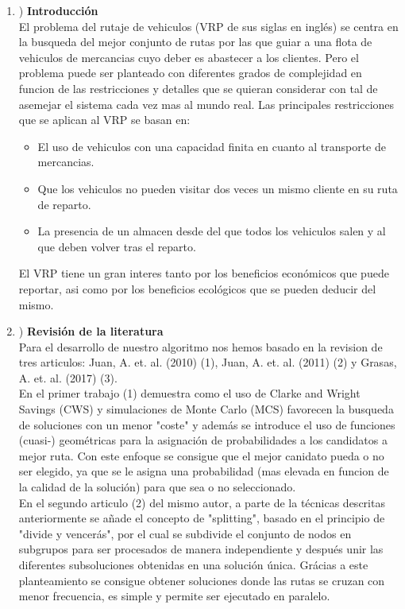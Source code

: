 \documentclass[11pt]{article} %
\begin{document}
\renewcommand{\labelenumi}{\arabic{enumi}}
 \begin{enumerate}
   \item) \textbf{Introducción}\\[0.2cm]
El problema del rutaje de vehiculos (VRP de sus siglas en inglés) se centra en la busqueda del mejor conjunto de rutas por las que guiar a una flota de vehiculos de mercancias cuyo deber es abastecer a los clientes. Pero el problema puede ser planteado con diferentes grados de complejidad en funcion de las restricciones y detalles que se quieran considerar con tal de asemejar el sistema cada vez mas al mundo real. Las principales restricciones que se aplican al VRP se basan en:
   \begin{itemize}
       \item El uso de vehiculos con una capacidad finita en cuanto al transporte de mercancias.
       \item Que los vehiculos no pueden visitar dos veces un mismo cliente en su ruta de reparto.
       \item La presencia de un almacen desde del que todos los vehiculos salen y al que deben volver tras el reparto.
   \end{itemize} 
El VRP tiene un gran interes tanto por los beneficios económicos que puede reportar, asi como por los beneficios ecológicos que se pueden deducir del mismo.
   \item) \textbf{Revisión de la literatura}\\[0.2cm]
Para el desarrollo de nuestro algoritmo nos hemos basado en la revision de tres articulos: Juan, A. et. al. (2010) (1), Juan, A. et. al. (2011) (2) y Grasas, A. et. al. (2017) (3).\\
En el primer trabajo (1) demuestra como el uso de Clarke and Wright Savings (CWS) y simulaciones de Monte Carlo (MCS) favorecen la busqueda de soluciones con un menor "coste" y además se introduce el uso de funciones (cuasi-) geométricas para la asignación de probabilidades a los candidatos a mejor ruta. Con este enfoque se consigue que el mejor canidato pueda o no ser elegido, ya que se le asigna una probabilidad (mas elevada en funcion de la calidad de la solución) para que sea o no seleccionado.\\
En el segundo articulo (2) del mismo autor, a parte de la técnicas descritas anteriormente se añade el concepto de "splitting", basado en el principio de "divide y vencerás", por el cual se subdivide el conjunto de nodos en subgrupos para ser procesados de manera independiente y después unir las diferentes subsoluciones obtenidas en una solución única. Grácias a este planteamiento se consigue obtener soluciones donde las rutas se cruzan con menor frecuencia, es simple y permite ser ejecutado en paralelo.\\

\end{enumerate}
\end{document}
